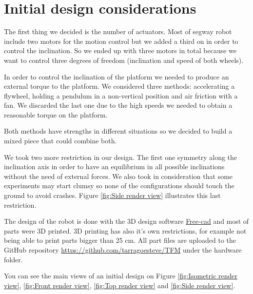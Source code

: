 \section{Initial design considerations}
The first thing we decided is the number of actuators.
Most of segway robot include two motors for the motion control but
we added a third on in order to control the inclination.
So we ended up with three motors in total because we want to control
three degrees of freedom (inclination and speed of both wheels).

In order to control the inclination of the platform we needed to produce
an external torque to the platform. We considered three methods: accelerating
a flywheel, holding a pendulum in a non-vertical position and air friction
with a fan. We discarded the last one due to the high speeds we needed to obtain
a reasonable torque on the platform.

Both methods have strengths in different situations so we decided to build a mixed
piece that could combine both. 

We took two more restriction in our design. The first one symmetry along the 
inclination axis in order to have an equilibrium in all possible inclinations
without the need of external forces. 
We also took in consideration that some experiments may start clumsy so none of
the configurations should touch the ground to avoid crashes. Figure \ref{fig:Side render view}
illustrates this last restriction.   

The design of the robot is done with the 3D design software 
\href{https://www.freecadweb.org/}{Free-cad} and most of parts were 3D printed. 3D printing has
also it's own restrictions, for example not being able to print parts bigger than 25 cm.
All part files are uploaded to the GitHub repository \url{https://github.com/tarragoesteve/TFM} under the hardware folder.

You can see the main views of an initial design on Figure \ref{fig:Isometric render view}, \ref{fig:Front render view}, \ref{fig:Top render view} and \ref{fig:Side render view}.

